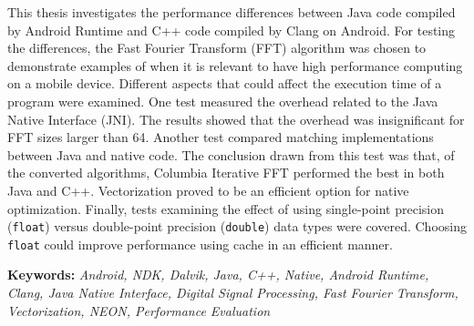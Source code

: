 This thesis investigates the performance differences between Java code compiled by Android Runtime and C++ code compiled by Clang on Android. For testing the differences, the Fast Fourier Transform (FFT) algorithm was chosen to demonstrate examples of when it is relevant to have high performance computing on a mobile device. Different aspects that could affect the execution time of a program were examined. One test measured the overhead related to the Java Native Interface (JNI). The results showed that the overhead was insignificant for FFT sizes larger than 64. Another test compared matching implementations between Java and native code. The conclusion drawn from this test was that, of the converted algorithms, Columbia Iterative FFT performed the best in both Java and C++. Vectorization proved to be an efficient option for native optimization. Finally, tests examining the effect of using single-point precision (\texttt{float}) versus double-point precision (\texttt{double}) data types were covered. Choosing \texttt{float} could improve performance using cache in an efficient manner.

\textbf{Keywords:} \emph{Android, NDK, Dalvik, Java, C++, Native, Android Runtime, Clang, Java Native Interface, Digital Signal Processing, Fast Fourier Transform, Vectorization, NEON, Performance Evaluation}
